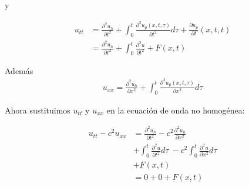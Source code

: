 \documentclass[11pt]{book}
\theoremstyle{plain}
\theoremstyle{definition}
\begin{document}
y 

\begin{align*}
    u_{tt} &= \frac{\partial^2 u_{h}}{\partial t^2} + \int_{0}^{t} \frac{\partial^2 u_{p}(x,t,\tau)}{\partial t^2} d\tau + \frac{\partial u_{p}}{\partial t}(x,t,t)\\
    &= \frac{\partial^2 u_{h}}{\partial t^2} + \int_{0}^{t} \frac{\partial^2 u}{\partial t^2} + F(x,t)
\end{align*}

Además
\begin{align*}
    u_{xx} = \frac{\partial^2 u_{h}}{\partial x^2} + \int_{0}^{t} \frac{\partial^2 u_{p}(x,t,\tau)}{\partial x^2} d\tau
\end{align*}

Ahora sustituimos \( u_{tt} \) y \( u_{xx} \) en la ecuación de onda no homogénea:

\begin{align*}
    u_{tt} - c^2 u_{xx} &= \frac{\partial^2 u_{h}}{\partial t^2} - c^2\frac{\partial^2 u_{h}}{\partial x^2}\\
    &+ \int_{0}^{t} \frac{\partial^2 u}{\partial t^2} d\tau\ - c^2\int_{0}^{t} \frac{\partial^2 u}{\partial x^2} d\tau\\
    &+ F(x,t)\\
    &= 0 + 0 + F(x,t)
\end{align*}
\end{document}
